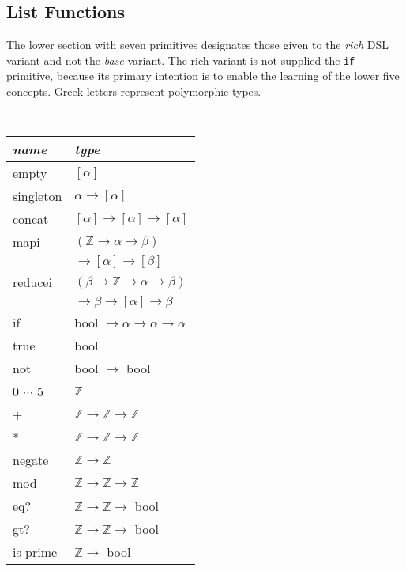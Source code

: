 \documentclass{article}
\begin{document}
\vfill


\subsection{List Functions}
The lower section with seven primitives designates those given to the
\emph{rich} DSL variant and not the \emph{base} variant. The rich variant is
not supplied the \texttt{if} primitive, because its primary intention is to
enable the learning of the lower five concepts.
Greek letters represent polymorphic types.
\begin{center}
\tt
\begin{tabular}{| l | l |}
  \hline
  \textrm{\emph{name}} & \textrm{\emph{type}} \\
  \hline
    empty & $\left[\alpha\right]$ \\
    singleton & $\alpha \to \left[\alpha\right]$ \\
    concat & $\left[\alpha\right] \to \left[\alpha\right] \to \left[\alpha\right]$ \\
    mapi & $(\mathbb{Z} \to \alpha \to \beta)$ \\
    & \qquad\qquad$\to \left[\alpha\right] \to \left[\beta\right]$ \\
    reducei & $(\beta \to \mathbb{Z} \to \alpha \to \beta)$\\
    & \qquad\qquad$\to \beta \to \left[\alpha\right] \to \beta$ \\
    \hline
    if & bool $\to \alpha \to \alpha \to \alpha$ \\
    \hline
    true & bool \\
    not & bool $\to$ bool \\
    0 $\cdots$ 5 & $\mathbb{Z}$ \\
    + & $\mathbb{Z} \to \mathbb{Z} \to \mathbb{Z}$ \\
    * & $\mathbb{Z} \to \mathbb{Z} \to \mathbb{Z}$ \\
    negate & $\mathbb{Z} \to \mathbb{Z}$ \\
    mod & $\mathbb{Z} \to \mathbb{Z} \to \mathbb{Z}$ \\
    eq? & $\mathbb{Z} \to \mathbb{Z} \to$ bool \\
    gt? & $\mathbb{Z} \to \mathbb{Z} \to$ bool \\
    is-prime & $\mathbb{Z} \to$ bool \\

\end{tabular}
\end{center}
\end{document}
